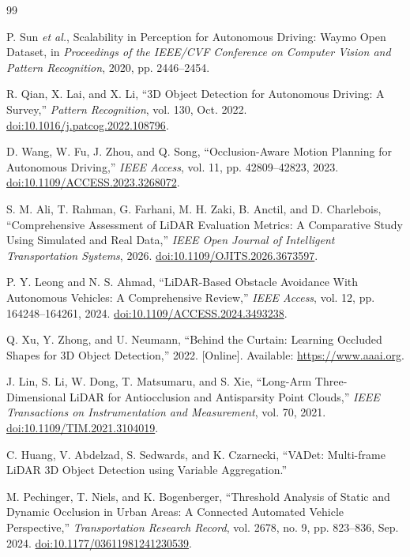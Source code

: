 \begin{thebibliography}{99}

\label{bib_ref_1} P. Sun \emph{et al.}, {Scalability in Perception for Autonomous Driving: Waymo Open Dataset}, in \emph{Proceedings of the IEEE/CVF Conference on Computer Vision and Pattern Recognition}, 2020, pp. 2446--2454.

\label{bib_ref_2} R. Qian, X. Lai, and X. Li, ``3D Object Detection for Autonomous Driving: A Survey,'' \emph{Pattern Recognition}, vol. 130, Oct. 2022. \href{https://doi.org/10.1016/j.patcog.2022.108796}{doi:10.1016/j.patcog.2022.108796}.

\label{bib_ref_3} D. Wang, W. Fu, J. Zhou, and Q. Song, ``Occlusion-Aware Motion Planning for Autonomous Driving,'' \emph{IEEE Access}, vol. 11, pp. 42809--42823, 2023. \href{https://doi.org/10.1109/ACCESS.2023.3268072}{doi:10.1109/ACCESS.2023.3268072}.

\label{bib_ref_4} S. M. Ali, T. Rahman, G. Farhani, M. H. Zaki, B. Anctil, and D. Charlebois, ``Comprehensive Assessment of LiDAR Evaluation Metrics: A Comparative Study Using Simulated and Real Data,'' \emph{IEEE Open Journal of Intelligent Transportation Systems}, 2026. \href{https://doi.org/10.1109/OJITS.2026.3673597}{doi:10.1109/OJITS.2026.3673597}.

\label{bib_ref_5} P. Y. Leong and N. S. Ahmad, ``LiDAR-Based Obstacle Avoidance With Autonomous Vehicles: A Comprehensive Review,'' \emph{IEEE Access}, vol. 12, pp. 164248--164261, 2024. \href{https://doi.org/10.1109/ACCESS.2024.3493238}{doi:10.1109/ACCESS.2024.3493238}.

\label{bib_ref_6} Q. Xu, Y. Zhong, and U. Neumann, ``Behind the Curtain: Learning Occluded Shapes for 3D Object Detection,'' 2022. [Online]. Available: \url{https://www.aaai.org}.

\label{bib_ref_7} J. Lin, S. Li, W. Dong, T. Matsumaru, and S. Xie, ``Long-Arm Three-Dimensional LiDAR for Antiocclusion and Antisparsity Point Clouds,'' \emph{IEEE Transactions on Instrumentation and Measurement}, vol. 70, 2021. \href{https://doi.org/10.1109/TIM.2021.3104019}{doi:10.1109/TIM.2021.3104019}.

\label{bib_ref_8} C. Huang, V. Abdelzad, S. Sedwards, and K. Czarnecki, ``VADet: Multi-frame LiDAR 3D Object Detection using Variable Aggregation.''

\label{bib_ref_9} M. Pechinger, T. Niels, and K. Bogenberger, ``Threshold Analysis of Static and Dynamic Occlusion in Urban Areas: A Connected Automated Vehicle Perspective,'' \emph{Transportation Research Record}, vol. 2678, no. 9, pp. 823--836, Sep. 2024. \href{https://doi.org/10.1177/03611981241230539}{doi:10.1177/03611981241230539}.


\end{thebibliography}
